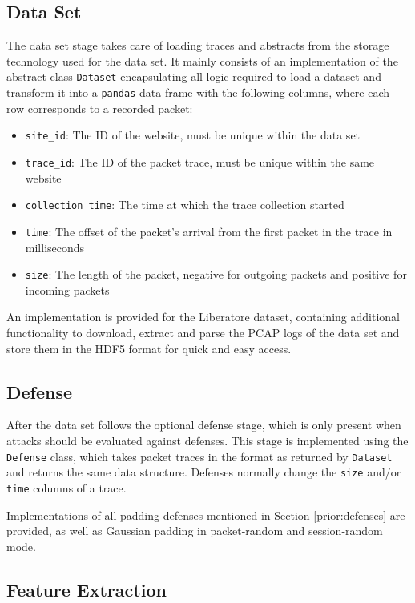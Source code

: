 \documentclass[
	ruledheaders=chapter,
	class=report,
	thesis={type=master, department=inf},
	accentcolor=1c,
	custommargins=true,
	marginpar=false,
	parskip=half-,
	fontsize=11pt,
]{tudapub}
\begin{document}
	\subsection{Data Set}
	
	The data set stage takes care of loading traces and abstracts from the storage technology used for the data set. It mainly consists of an implementation of the abstract class \texttt{Dataset} encapsulating all logic required to load a dataset and transform it into a \texttt{pandas} data frame with the following columns, where each row corresponds to a recorded packet:
	
	\begin{itemize}
		\item \texttt{site\_id}: The ID of the website, must be unique within the data set
		\item \texttt{trace\_id}: The ID of the packet trace, must be unique within the same website
		\item \texttt{collection\_time}: The time at which the trace collection started
		\item \texttt{time}: The offset of the packet's arrival from the first packet in the trace in milliseconds
		\item \texttt{size}: The length of the packet, negative for outgoing packets and positive for incoming packets
	\end{itemize}

	An implementation is provided for the Liberatore dataset, containing additional functionality to download, extract and parse the PCAP logs of the data set and store them in the HDF5 format for quick and easy access.
	
	\subsection{Defense}
	
	After the data set follows the optional defense stage, which is only present when attacks should be evaluated against defenses. This stage is implemented using the \texttt{Defense} class, which takes packet traces in the format as returned by \texttt{Dataset} and returns the same data structure. Defenses normally change the \texttt{size} and/or \texttt{time} columns of a trace.
	
	Implementations of all padding defenses mentioned in Section \ref{prior:defenses} are provided, as well as Gaussian padding in packet-random and session-random mode.
	
	\subsection{Feature Extraction}
	
\end{document}
